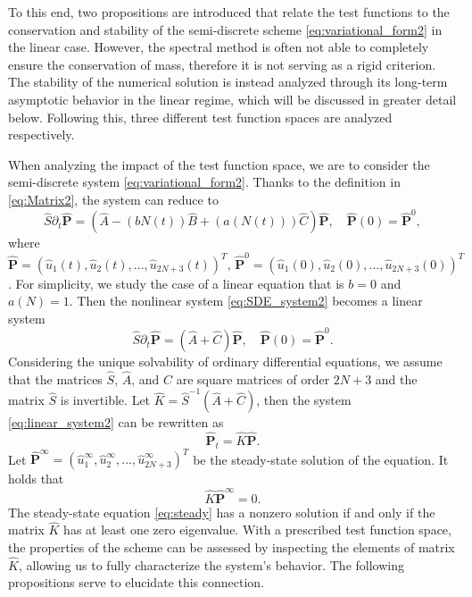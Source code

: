 To this end, two propositions are introduced that relate the test functions to the conservation and stability of the semi-discrete scheme \eqref{eq:variational_form2} in the linear case. However, the spectral method is often not able to completely ensure the conservation of mass, therefore it is not serving as a rigid criterion. The stability of the numerical solution is instead analyzed through its long-term asymptotic behavior in the linear regime, which will be discussed in greater detail below. Following this, three different test function spaces are analyzed respectively.


When analyzing the impact of the test function space, we are to consider the semi-discrete system \eqref{eq:variational_form2}. Thanks to the definition in \eqref{eq:Matrix2}, the system can reduce to
\begin{equation}
    \label{eq:SDE_system2}
    \hat{S}\partial_t\hat{\mathbf{P}}=\left(\hat{A}-\left(bN(t)\right)\hat{B}+\left(a(N(t))\right)\hat{C}\right)\hat{\mathbf{P}},\quad \hat{\mathbf{P}}(0)=\hat{\mathbf{P}}^0,
\end{equation}
where $\hat{\mathbf{P}}=(\hat{u}_1(t),\hat{u}_2(t),...,\hat{u}_{2N+3}(t))^T,\,\hat{\mathbf{P}}^0=(\hat{u}_1(0),\hat{u}_2(0),...,\hat{u}_{2N+3}(0))^T$. For simplicity, we study the case of a linear equation that is $b=0$ and $a(N)=1$. Then the nonlinear system \eqref{eq:SDE_system2} becomes a linear system
\begin{equation}
    \label{eq:linear_system2}
    \hat{S}\partial_t \hat{\mathbf{P}}=(\hat{A}+\hat{C})\hat{\mathbf{P}}, \quad \hat{\mathbf{P}}(0)=\hat{\mathbf{P}}^0.
\end{equation}
Considering the unique solvability of ordinary differential equations, we assume that the matrices $\hat{S}$, $\hat{A}$, and $\hat{C}$ are square matrices of order $2N+3$ and the matrix $\hat{S}$ is invertible. Let $\hat{K}=\hat{S}^{-1}(\hat{A}+\hat{C})$, then the system \eqref{eq:linear_system2} can be rewritten as
\begin{equation}
\label{eq:linear_system3}
    \hat{\mathbf{P}}_t=\hat{K}\hat{\mathbf{P}}.
\end{equation}
Let $\hat{\mathbf{P}}^{\infty}=(\hat{u}_1^{\infty},\hat{u}_2^{\infty},...,\hat{u}_{2N+3}^{\infty})^T$ be the steady-state solution of the equation. It holds that
\begin{equation}
    \label{eq:steady}
    \hat{K}\hat{\mathbf{P}}^{\infty}=0.
\end{equation}
The steady-state equation \eqref{eq:steady} has a nonzero solution if and only if the matrix $\hat{K}$ has at least one zero eigenvalue. With a prescribed test function space, the properties of the scheme can be assessed by inspecting the elements of matrix $\hat{K}$, allowing us to fully characterize the system's behavior. The following propositions serve to elucidate this connection.

